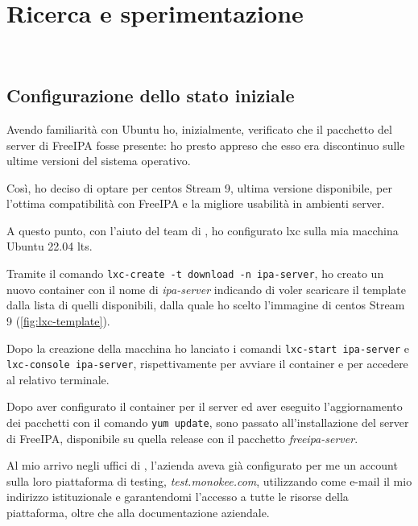 
\chapter{Ricerca e sperimentazione}
\label{cap:ricerca-sperimentazione}

\\

\section{Configurazione dello stato iniziale}

Avendo familiarità con Ubuntu ho, inizialmente, verificato che il pacchetto del server di FreeIPA fosse presente: ho presto appreso che esso era discontinuo sulle ultime versioni del sistema operativo.

Così, ho deciso di optare per \acrshort{centos} Stream 9, ultima versione disponibile, per l'ottima compatibilità con FreeIPA e la migliore usabilità in ambienti server.

A questo punto, con l'aiuto del team di \myAzienda, ho configurato \acrshort{lxc} sulla mia macchina Ubuntu 22.04 \acrfull{lts}.

Tramite il comando \texttt{lxc-create -t download -n ipa-server}, ho creato un nuovo container con il nome di \emph{ipa-server} indicando di voler scaricare il template dalla lista di quelli disponibili, dalla quale ho scelto l'immagine di \acrshort{centos} Stream 9 (\autoref{fig:lxc-template}).

Dopo la creazione della macchina ho lanciato i comandi \texttt{lxc-start ipa-server} e \texttt{lxc-console ipa-server}, rispettivamente per avviare il container e per accedere al relativo terminale.


Dopo aver configurato il container per il server ed aver eseguito l'aggiornamento dei pacchetti con il comando \texttt{yum update}, sono passato all'installazione del server di FreeIPA, disponibile su quella release con il pacchetto \emph{freeipa-server}.


Al mio arrivo negli uffici di \myAzienda, l'azienda aveva già configurato per me un account sulla loro piattaforma di testing, \emph{test.monokee.com}, utilizzando come e-mail il mio indirizzo istituzionale e garantendomi l'accesso a tutte le risorse della piattaforma, oltre che alla documentazione aziendale.

